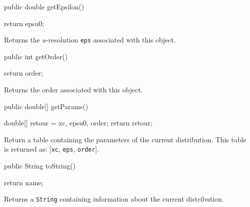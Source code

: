 \begin{code}

   public double getEpsilon()\begin{hide} {
      return epsu0;
   }\end{hide}
\end{code}
\begin{tabb}
   Returns the $u$-resolution \texttt{eps} associated with this object.
\end{tabb}
\begin{code}

   public int getOrder()\begin{hide} {
      return order;
   }\end{hide}
\end{code}
\begin{tabb}
   Returns the order associated with this object.
\end{tabb}
\begin{code}

   public double[] getParams()\begin{hide} {
      double[] retour = {xc, epsu0, order};
      return retour;
   }\end{hide}
\end{code}
\begin{tabb}
   Return a table containing the parameters of the current distribution.
   This table is returned as: [\texttt{xc}, \texttt{eps}, \texttt{order}].
\end{tabb}
\begin{code}

   public String toString()\begin{hide} {
      return name;
   }\end{hide}
\end{code}
\begin{tabb}
   Returns a \texttt{String} containing information about the current distribution.
\end{tabb}
